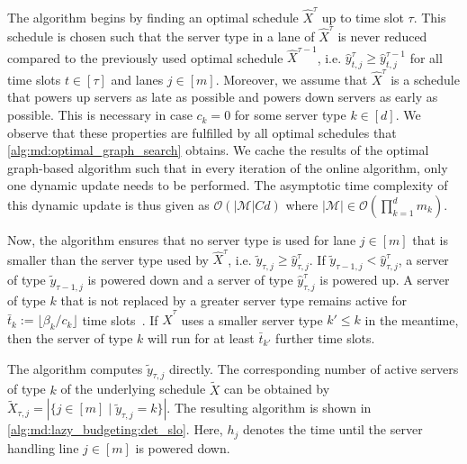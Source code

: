 The algorithm begins by finding an optimal schedule $\hat{X}^{\tau}$ up to time slot $\tau$. This schedule is chosen such that the server type in a lane of $\hat{X}^{\tau}$ is never reduced compared to the previously used optimal schedule $\hat{X}^{\tau-1}$, i.e. $\hat{y}_{t,j}^{\tau} \geq \hat{y}_{t,j}^{\tau-1}$ for all time slots $t \in [\tau]$ and lanes $j \in [m]$. Moreover, we assume that $\hat{X}^{\tau}$ is a schedule that powers up servers as late as possible and powers down servers as early as possible. This is necessary in case $c_k = 0$ for some server type $k \in [d]$. We observe that these properties are fulfilled by all optimal schedules that \cref{alg:md:optimal_graph_search} obtains. We cache the results of the optimal graph-based algorithm such that in every iteration of the online algorithm, only one dynamic update needs to be performed. The asymptotic time complexity of this dynamic update is thus given as $\mathcal{O}(|\mathcal{M}| C d)$ where $|\mathcal{M}| \in \mathcal{O}(\prod_{k=1}^d m_k)$.

Now, the algorithm ensures that no server type is used for lane $j \in [m]$ that is smaller than the server type used by $\hat{X}^{\tau}$, i.e. $\widetilde{y}_{\tau,j} \geq \hat{y}_{\tau,j}^{\tau}$. If $\widetilde{y}_{\tau-1,j} < \hat{y}_{\tau,j}^{\tau}$, a server of type $\widetilde{y}_{\tau-1,j}$ is powered down and a server of type $\hat{y}_{\tau,j}^{\tau}$ is powered up. A server of type $k$ that is not replaced by a greater server type remains active for $\bar{t}_k := \lfloor \beta_k / c_k \rfloor$ time slots~\cite{Albers2021}. If $\hat{X}^{\tau}$ uses a smaller server type $k' \leq k$ in the meantime, then the server of type $k$ will run for at least $\bar{t}_{k'}$ further time slots.

The algorithm computes $\widetilde{y}_{\tau,j}$ directly. The corresponding number of active servers of type $k$ of the underlying schedule $\widetilde{X}$ can be obtained by $\widetilde{X}_{\tau,j} = |\{j \in [m] \mid \widetilde{y}_{\tau,j} = k\}|$. The resulting algorithm is shown in \cref{alg:md:lazy_budgeting:det_slo}. Here, $h_j$ denotes the time until the server handling line $j \in [m]$ is powered down.

